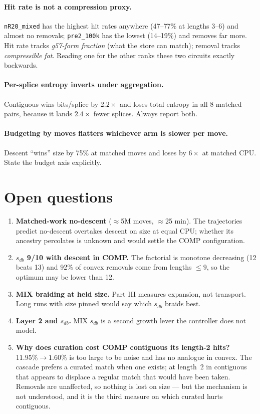 \documentclass[11pt]{article}
\newcommand{\code}[1]{\texttt{#1}}
\begin{document}
\paragraph{Hit rate is not a compression proxy.} \code{nR20\_mixed} has the
highest hit rates anywhere (47--77\% at lengths 3--6) and almost no removals;
\code{pre2\_100k} has the lowest (14--19\%) and removes far more. Hit rate
tracks \emph{g57-form fraction} (what the store can match); removal tracks
\emph{compressible fat}. Reading one for the other ranks these two circuits
exactly backwards.

\paragraph{Per-splice entropy inverts under aggregation.} Contiguous wins
bits/splice by $2.2\times$ and loses total entropy in all 8 matched pairs,
because it lands $2.4\times$ fewer splices. Always report both.

\paragraph{Budgeting by moves flatters whichever arm is slower per move.}
Descent ``wins'' size by 75\% at matched moves and loses by $6\times$ at matched
CPU. State the budget axis explicitly.

\section{Open questions}

\begin{enumerate}
\item \textbf{Matched-work no-descent} ($\approx$5M moves, $\approx$25 min).
The trajectories predict no-descent overtakes descent on size at equal CPU;
whether its ancestry percolates is unknown and would settle the COMP
configuration.
\item \textbf{$s_{db}$ 9/10 with descent in COMP.} The factorial is monotone
decreasing (12 beats 13) and 92\% of convex removals come from lengths $\le9$,
so the optimum may be lower than 12.
\item \textbf{MIX braiding at held size.} Part III measures expansion, not
transport. Long runs with size pinned would say which $s_{db}$ braids best.
\item \textbf{Layer 2 and $s_{db}$.} MIX $s_{db}$ is a second growth lever the
controller does not model.
\item \textbf{Why does curation cost COMP contiguous its length-2 hits?}
$11.95\% \rightarrow 1.60\%$ is too large to be noise and has no analogue in
convex. The cascade prefers a curated match when one exists; at length~2 in
contiguous that appears to displace a regular match that would have been taken.
Removals are unaffected, so nothing is lost on size --- but the mechanism is
not understood, and it is the third measure on which curated hurts contiguous.
\end{enumerate}
\end{document}
